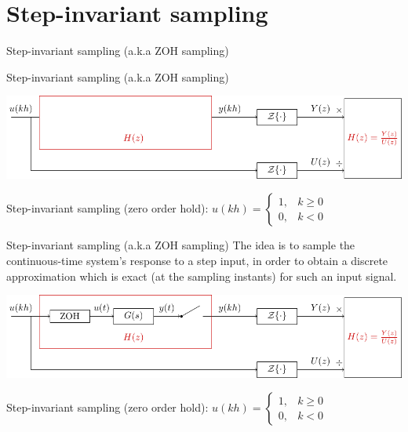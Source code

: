 \documentclass[presentation,aspectratio=169]{beamer}
\begin{document}
\section{Step-invariant sampling}
\label{sec:org3661187}


\begin{frame}[label={sec:org0cb5ac5}]{Step-invariant sampling (a.k.a ZOH sampling)}
\end{frame}

\begin{frame}[label={sec:orgd25ecf2}]{Step-invariant sampling (a.k.a ZOH sampling)}
\begin{center}
\includegraphics[width=0.9\linewidth]{../../figures/invariant-sampling-white.pdf}
\end{center}

\pause
Step-invariant sampling (zero order hold): \(u(kh) = \begin{cases} 1, & k \ge 0\\0, & k<0 \end{cases}\)
\end{frame}

\begin{frame}[label={sec:orga4100da}]{Step-invariant sampling (a.k.a ZOH sampling)}
The idea is to sample the continuous-time system's response to a step input, in order to obtain a discrete approximation which is \alert{exact} (at the sampling instants) for such an input signal. 

\begin{center}
\includegraphics[width=0.9\linewidth]{../../figures/invariant-sampling.pdf}
\end{center}

Step-invariant sampling (zero order hold): \(u(kh) = \begin{cases} 1, & k \ge 0\\0, & k<0 \end{cases}\)
\end{frame}
\end{document}

